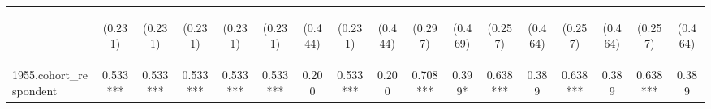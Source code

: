 \begin{center}
\begin{tabular}{lcccccccccccccccc}
\vspace{4pt} & \begin{footnotesize}(0.231)\end{footnotesize} & \begin{footnotesize}(0.231)\end{footnotesize} & \begin{footnotesize}(0.231)\end{footnotesize} & \begin{footnotesize}(0.231)\end{footnotesize} & \begin{footnotesize}(0.231)\end{footnotesize} & \begin{footnotesize}(0.444)\end{footnotesize} & \begin{footnotesize}(0.231)\end{footnotesize} & \begin{footnotesize}(0.444)\end{footnotesize} & \begin{footnotesize}(0.297)\end{footnotesize} & \begin{footnotesize}(0.469)\end{footnotesize} & \begin{footnotesize}(0.257)\end{footnotesize} & \begin{footnotesize}(0.464)\end{footnotesize} & \begin{footnotesize}(0.257)\end{footnotesize} & \begin{footnotesize}(0.464)\end{footnotesize} & \begin{footnotesize}(0.257)\end{footnotesize} & \begin{footnotesize}(0.464)\end{footnotesize} \\
1955.cohort\_respondent & 0.533*** & 0.533*** & 0.533*** & 0.533*** & 0.533*** & 0.200 & 0.533*** & 0.200 & 0.708*** & 0.399* & 0.638*** & 0.389 & 0.638*** & 0.389 & 0.638*** & 0.389 \\

\end{tabular}
\end{center}

